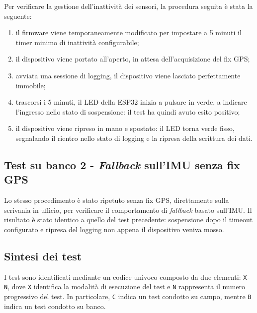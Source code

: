Per verificare la gestione dell'inattività dei sensori, la procedura seguita
è stata la seguente:

\begin{enumerate}
    \item il firmware viene temporaneamente modificato per impostare a 5
    minuti il timer minimo di inattività configurabile;
    \item il dispositivo viene portato all'aperto, in attesa
    dell'acquisizione del fix GPS;
    \item avviata una sessione di logging, il dispositivo viene lasciato
    perfettamente immobile;
    \item trascorsi i 5 minuti, il LED della ESP32 inizia a pulsare in 
    verde, a indicare l'ingresso nello stato di sospensione: il test ha 
    quindi avuto esito positivo;
    \item il dispositivo viene ripreso in mano e spostato: il LED torna
    verde fisso, segnalando il rientro nello stato di logging e la ripresa
    della scrittura dei dati.
\end{enumerate}


\subsection{Test su banco 2 - \textit{Fallback} sull'IMU senza fix GPS}
\label{subsubsec:test_banco_2}

Lo stesso procedimento è stato ripetuto senza fix GPS, direttamente sulla
scrivania in ufficio, per verificare il comportamento di \textit{fallback}
basato sull'IMU. Il risultato è stato identico a quello del test precedente:
sospensione dopo il timeout configurato e ripresa del logging non appena il
dispositivo veniva mosso.

\subsection{Sintesi dei test}
\label{subsec:sintesi_test}

I test sono identificati mediante un codice univoco composto da due elementi:
\texttt{X-N}, dove \texttt{X} identifica la modalità di esecuzione del test e 
\texttt{N} rappresenta il numero progressivo del test. In particolare, \texttt{C} 
indica un test condotto su campo, mentre \texttt{B} indica un test condotto su banco.

